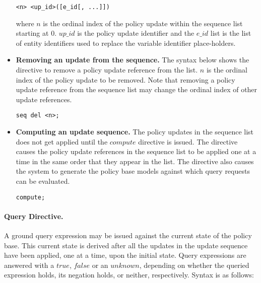 \documentclass{llncs}
\begin{document}
\begin{itemize}
              \begin{verbatim}<n> <up_id>([e_id[, ...]])\end{verbatim}

              \noindent where $n$ is the ordinal index of the policy update
              within the sequence list starting at 0. $up\_id$ is the policy
              update identifier and the $e\_id$ list is the list of entity
              identifiers used to replace the variable identifier
              place-holders.

            \vspace{1mm}
            \item
              {\bf Removing an update from the sequence.} The syntax below
              shows the directive to remove a policy update reference from the
              list. $n$ is the ordinal index of the policy update to be
              removed. Note that removing a policy update reference from the
              sequence list may change the ordinal index of other update
              references.
                                                                  
              \begin{verbatim}seq del <n>;\end{verbatim}

            \vspace{1mm}
            \item
              {\bf Computing an update sequence.} The policy updates in the
              sequence list does not get applied until the $compute$ directive
              is issued. The directive causes the policy update references in
              the sequence list to be applied one at a time in the same order
              that they appear in the list. The directive also causes the
              system to generate the policy base models against which query
              requests can be evaluated.
                                                               
             \begin{verbatim}compute;\end{verbatim}
          \end{itemize}

        \paragraph{\bf Query Directive.}

          A ground query expression may be issued against the current state of
          the policy base. This current state is derived after all the updates
          in the update sequence have been applied, one at a time, upon the
          initial state. Query expressions are answered with a $true$, $false$
          or an $unknown$, depending on whether the queried expression holds,
          its negation holds, or neither, respectively. Syntax is as follows:
\end{document}
